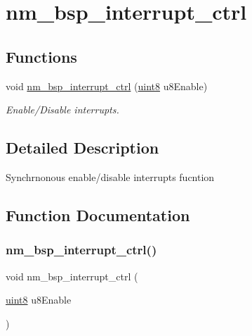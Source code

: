 \hypertarget{group__NmBspInterruptCtrl}{}\section{nm\+\_\+bsp\+\_\+interrupt\+\_\+ctrl}
\label{group__NmBspInterruptCtrl}
\subsection*{Functions}
\begin{DoxyCompactItemize}
\item 
void \hyperlink{group__NmBspInterruptCtrl_gad08e47a941e87d631200f990000323dc}{nm\+\_\+bsp\+\_\+interrupt\+\_\+ctrl} (\hyperlink{group__DataT_ga4df709a77647e870bbf1d955b8edc9a6}{uint8} u8\+Enable)
\begin{DoxyCompactList}\small\item\em Enable/\+Disable interrupts. \end{DoxyCompactList}\end{DoxyCompactItemize}


\subsection{Detailed Description}
Synchrnonous enable/disable interrupts fucntion 

\subsection{Function Documentation}
\mbox{\label{group__NmBspInterruptCtrl_gad08e47a941e87d631200f990000323dc}} 
\subsubsection{\texorpdfstring{nm\+\_\+bsp\+\_\+interrupt\+\_\+ctrl()}{nm\_bsp\_interrupt\_ctrl()}}
{\footnotesize\ttfamily void nm\+\_\+bsp\+\_\+interrupt\+\_\+ctrl (\begin{DoxyParamCaption}\item[{\hyperlink{group__DataT_ga4df709a77647e870bbf1d955b8edc9a6}{uint8}}]{u8\+Enable }\end{DoxyParamCaption})}



